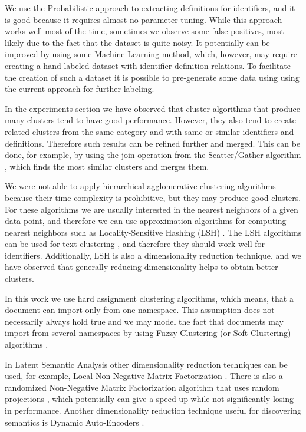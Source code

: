 We use the Probabilistic approach to extracting definitions for identifiers, and
it is good because it requires almost no parameter tuning.
While this approach works well most of the time, sometimes we observe
some false positives, most likely due to the fact that the dataset is
quite noisy. It potentially can be improved by using some Machine Learning
method, which, however, may require creating a hand-labeled dataset
with identifier-definition relations. To facilitate the creation of such a
dataset it is possible to pre-generate some data using using the current approach
for further labeling.

In the experiments section we have observed that cluster algorithms that produce
many clusters tend to have good performance. However, they also tend to create related
clusters from the same category and with same or similar identifiers and
definitions. Therefore such results can be refined further and merged.
This can be done, for example, by using the join operation from
the Scatter/Gather algorithm \cite{cutting1992scatter}, which finds the most
similar clusters and merges them.

We were not able to apply hierarchical agglomerative clustering algorithms because
their time complexity is prohibitive, but they may produce good clusters.
For these algorithms we are usually interested in the nearest neighbors of a given
data point, and therefore we can use approximation algorithms for computing nearest
neighbors such as Locality-Sensitive Hashing (LSH) \cite{leskovec2014mining}.
The LSH algorithms can be used for text clustering \cite{ravichandran2005randomized},
and therefore they should work well for identifiers. Additionally, LSH is also a
dimensionality reduction technique, and we have observed that generally
reducing dimensionality helps to obtain better clusters.

In this work we use hard assignment clustering algorithms, which means, that a document
can import only from one namespace. This assumption does not necessarily always hold true
and we may model the fact that documents may import from several namespaces by
using Fuzzy Clustering (or Soft Clustering) algorithms \cite{baraldi1999survey}.

In Latent Semantic Analysis other dimensionality reduction techniques
can be used, for example, Local Non-Negative Matrix Factorization \cite{li2001learning}.
There is also a randomized Non-Negative Matrix Factorization algorithm that uses
random projections \cite{wang2010efficient} \cite{damle2014random},
which potentially can give a speed up while not significantly losing
in performance. Another dimensionality reduction technique useful for
discovering semantics is Dynamic Auto-Encoders \cite{mirowski2010dynamic}.

